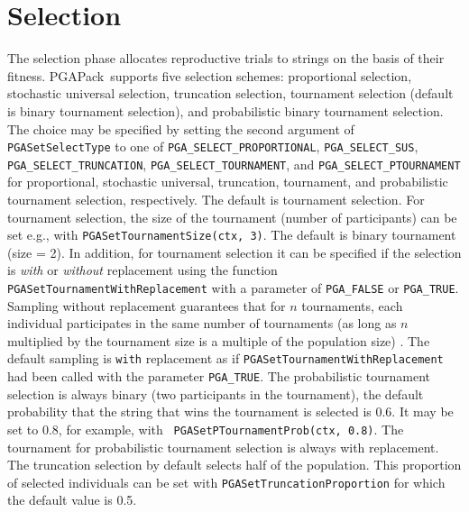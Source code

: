 \documentclass{report}
\newcommand{\pga}{PGAPack}
\begin{document}
\section{Selection}\label{sec:selection}

The selection phase allocates reproductive trials to strings on the basis of
their fitness.  \pga\ supports five selection schemes: proportional selection,
stochastic universal selection, truncation selection, tournament
selection (default is binary tournament selection), and probabilistic
binary tournament selection.  The choice may be specified by setting the
second argument of {\tt PGASetSelectType} to one of
\verb+PGA_SELECT_PROPORTIONAL+, \verb+PGA_SELECT_SUS+,
\verb+PGA_SELECT_TRUNCATION+, \verb+PGA_SELECT_TOURNAMENT+, and
\verb+PGA_SELECT_PTOURNAMENT+ for proportional, stochastic universal,
truncation, tournament, and probabilistic tournament selection,
respectively.  The default is tournament selection. For tournament
selection, the size of the tournament (number of participants) can be
set e.g., with \verb+PGASetTournamentSize(ctx, 3)+. The default is binary
tournament (size = 2). In addition, for tournament selection it can be
specified if the selection is \textit{with} or \textit{without}
replacement using the function \verb+PGASetTournamentWithReplacement+ with
a parameter of \verb+PGA_FALSE+ or \verb+PGA_TRUE+. Sampling without
replacement guarantees that for $n$ tournaments, each individual
participates in the same number of tournaments (as long as $n$
multiplied by the tournament size is a multiple of the population size)
\cite{GKD89}.  The default sampling is
\texttt{with} replacement as if \verb+PGASetTournamentWithReplacement+
had been called with the parameter \verb+PGA_TRUE+.  The probabilistic
tournament selection is always binary (two participants in the
tournament), the default probability that the string that wins the
tournament is selected is 0.6.  It may be set to 0.8, for example, with {\tt
PGASetPTournamentProb(ctx, 0.8)}. The tournament for probabilistic
tournament selection is always with replacement. The truncation selection
by default selects half of the population. This proportion of selected
individuals can be set with \verb+PGASetTruncationProportion+ for which
the default value is 0.5.
\end{document}
